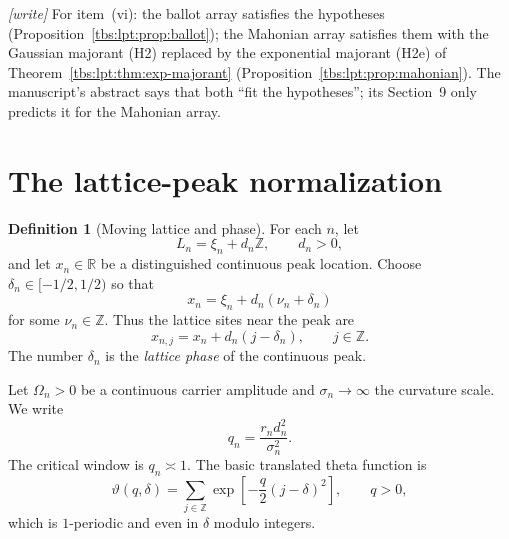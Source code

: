 \documentclass[11pt,a4paper]{article}
\numberwithin{equation}{section}
\theoremstyle{definition}
\newtheorem{definition}[theorem]{Definition}
\newcommand{\Z}{\mathbb Z}
\newcommand{\R}{\mathbb R}
\begin{document}
\emph{[write]} For item~(vi): the ballot array satisfies the hypotheses
(Proposition~\ref{tbs:lpt:prop:ballot}); the Mahonian array satisfies
them with the Gaussian majorant (H2) replaced by the exponential majorant
(H2e) of Theorem~\ref{tbs:lpt:thm:exp-majorant}
(Proposition~\ref{tbs:lpt:prop:mahonian}). The manuscript's abstract says
that both ``fit the hypotheses''; its Section~9 only predicts it for the
Mahonian array.

\section{The lattice-peak normalization}\label{tbs:lpt:sec:normalization}

\begin{definition}[Moving lattice and phase]\label{tbs:lpt:def:lattice}
For each $n$, let
\[
 L_n=\xi_n+d_n\Z,\qquad d_n>0,
\]
and let $x_n\in\R$ be a distinguished continuous peak location. Choose
$\delta_n\in[-1/2,1/2)$ so that
\begin{equation}\label{tbs:lpt:eq:phase}
 x_n=\xi_n+d_n(\nu_n+\delta_n)
\end{equation}
for some $\nu_n\in\Z$. Thus the lattice sites near the peak are
\[
 x_{n,j}=x_n+d_n(j-\delta_n),\qquad j\in\Z.
\]
The number $\delta_n$ is the \emph{lattice phase} of the continuous peak.
\end{definition}

Let $\Omega_n>0$ be a continuous carrier amplitude and
$\sigma_n\to\infty$ the curvature scale. We write
\begin{equation}\label{tbs:lpt:eq:qdef}
 q_n=\frac{r_n d_n^2}{\sigma_n^2}.
\end{equation}
The critical window is $q_n\asymp1$. The basic translated theta function
is
\begin{equation}\label{tbs:lpt:eq:theta}
 \vartheta(q,\delta)=\sum_{j\in\Z}
 \exp\!\left[-\frac q2(j-\delta)^2\right],
 \qquad q>0,
\end{equation}
which is $1$-periodic and even in $\delta$ modulo integers.
\end{document}
